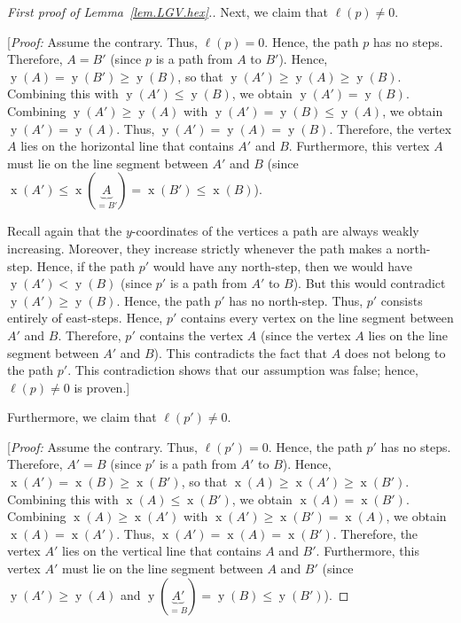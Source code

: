\documentclass[reqno]{amsart}
\newcommand{\0}{\phantom{c}}
\DeclareMathOperator{\xcoord}{x} %
\DeclareMathOperator{\ycoord}{y} %
\newenvironment{verlonglong}{}{}
\theoremstyle{plain}
\theoremstyle{definition}
\numberwithin{equation}{section}
\begin{document}
\begin{verlonglong}
\begin{proof}[First proof of Lemma~\ref{lem.LGV.hex}.]
Next, we claim that $\ell(p) \neq 0$.

[\textit{Proof:}
Assume the contrary. Thus, $\ell(p) = 0$.
Hence, the path $p$ has no steps.
Therefore, $A=B'$ (since $p$ is a path from $A$ to $B'$).
Hence, $\ycoord(A) = \ycoord(B') \geq \ycoord(B)$, so that $\ycoord(A') \geq \ycoord(A) \geq \ycoord(B)$.
Combining this with $\ycoord(A') \leq \ycoord(B)$, we obtain $\ycoord(A') = \ycoord(B)$.
Combining $\ycoord(A') \geq \ycoord(A)$ with $\ycoord(A') = \ycoord(B) \leq \ycoord(A)$, we obtain $\ycoord(A')  = \ycoord(A)$.
Thus, $\ycoord(A') = \ycoord(A) = \ycoord(B)$.
Therefore, the vertex $A$ lies on the horizontal line that contains $A'$ and $B$.
Furthermore, this vertex $A$ must lie on the line segment between $A'$ and $B$ (since $\xcoord(A') \leq \xcoord( \underbrace{A}_{=B'} ) = \xcoord(B') \leq \xcoord(B)$).

Recall again that the $y$-coordinates of the vertices a path are always weakly increasing.
Moreover, they increase strictly whenever the path makes a north-step.
Hence, if the path $p'$ would have any north-step, then we would have $\ycoord(A') < \ycoord(B)$ (since $p'$ is a path from $A'$ to $B$).
But this would contradict $\ycoord(A') \geq \ycoord(B)$.
Hence, the path $p'$ has no north-step.
Thus, $p'$ consists entirely of east-steps.
Hence, $p'$ contains every vertex on the line segment between $A'$ and $B$.
Therefore, $p'$ contains the vertex $A$ (since the vertex $A$ lies on the line segment between $A'$ and $B$).
This contradicts the fact that $A$ does not belong to the path $p'$.
This contradiction shows that our assumption was false; hence, $\ell(p) \neq0$ is proven.]

Furthermore, we claim that $\ell(p') \neq 0$.

[\textit{Proof:}
Assume the contrary. Thus, $\ell(p') = 0$.
Hence, the path $p'$ has no steps.
Therefore, $A'=B$ (since $p'$ is a path from $A'$ to $B$).
Hence, $\xcoord(A') = \xcoord(B) \geq \xcoord(B')$, so that $\xcoord(A) \geq \xcoord(A') \geq \xcoord (B')$.
Combining this with $\xcoord(A) \leq \xcoord(B')$, we obtain $\xcoord(A) = \xcoord(B')$.
Combining $\xcoord(A) \geq \xcoord(A')$ with $\xcoord(A') \geq \xcoord(B') = \xcoord(A)$, we obtain $\xcoord(A)  = \xcoord(A')$.
Thus, $\xcoord(A') = \xcoord(A) = \xcoord(B')$.
Therefore, the vertex $A'$ lies on the vertical line that contains $A$ and $B'$.
Furthermore, this vertex $A'$ must lie on the line segment between $A$ and $B'$ (since $\ycoord(A') \geq \ycoord(A)$ and $\ycoord(\underbrace{A'}_{=B}) = \ycoord(B) \leq \ycoord(B')$).


\end{proof}
\end{verlonglong}
\end{document}
